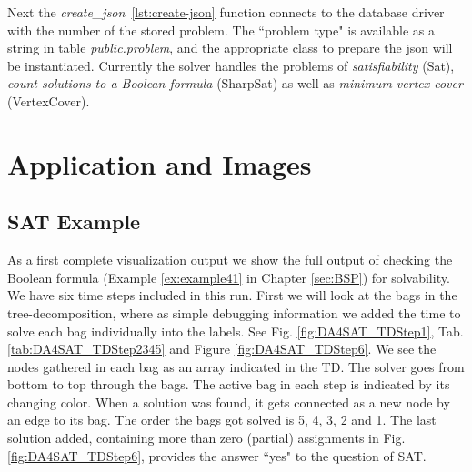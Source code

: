 \documentclass[a4paper, 12pt, bibliography=totoc]{scrartcl}
\begin{document}
Next the \textit{create\_json}~\ref{lst:create-json} function connects to the database driver with the number of the stored problem. 
The ``problem type" is available as a string in table \emph{public.problem}, and the appropriate class to prepare the json will be instantiated. Currently the solver handles the problems of \textit{satisfiability} (Sat), \textit{count solutions to a Boolean formula} (SharpSat) as well as \textit{minimum vertex cover} (VertexCover).

\newpage
\section{Application and Images}\label{sec:appl}

\subsection{SAT Example}\label{sec:applsat}
As a first complete visualization output we show the full output of checking the Boolean formula (Example \ref{ex:example41} in Chapter \ref{sec:BSP}) for solvability. We have six time steps included in this run. First we will look at the bags in the tree-decomposition, where as simple debugging information we added the time to solve each bag individually into the labels. See Fig. \ref{fig:DA4SAT_TDStep1}, Tab. \ref{tab:DA4SAT_TDStep2345} and Figure \ref{fig:DA4SAT_TDStep6}.  We see the nodes gathered in each bag as an array indicated in the TD. The solver goes from bottom to top through the bags. The active bag in each step is indicated by its changing color. When a solution was found, it gets connected as a new node by an edge to its bag. The order the bags got solved is 5, 4, 3, 2 and 1. The last solution added, containing more than zero (partial) assignments in Fig. \ref{fig:DA4SAT_TDStep6}, provides the answer ``yes" to the question of SAT.
\end{document}
